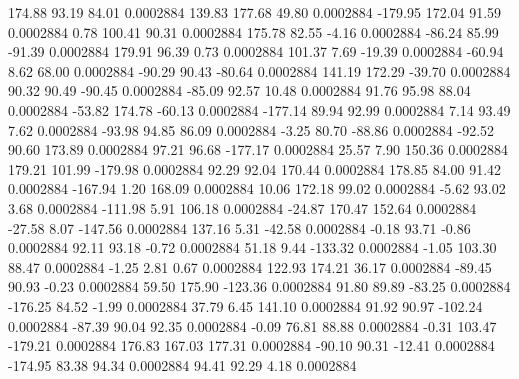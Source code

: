       174.88       93.19       84.01     0.0002884
      139.83      177.68       49.80     0.0002884
     -179.95      172.04       91.59     0.0002884
        0.78      100.41       90.31     0.0002884
      175.78       82.55       -4.16     0.0002884
      -86.24       85.99      -91.39     0.0002884
      179.91       96.39        0.73     0.0002884
      101.37        7.69      -19.39     0.0002884
      -60.94        8.62       68.00     0.0002884
      -90.29       90.43      -80.64     0.0002884
      141.19      172.29      -39.70     0.0002884
       90.32       90.49      -90.45     0.0002884
      -85.09       92.57       10.48     0.0002884
       91.76       95.98       88.04     0.0002884
      -53.82      174.78      -60.13     0.0002884
     -177.14       89.94       92.99     0.0002884
        7.14       93.49        7.62     0.0002884
      -93.98       94.85       86.09     0.0002884
       -3.25       80.70      -88.86     0.0002884
      -92.52       90.60      173.89     0.0002884
       97.21       96.68     -177.17     0.0002884
       25.57        7.90      150.36     0.0002884
      179.21      101.99     -179.98     0.0002884
       92.29       92.04      170.44     0.0002884
      178.85       84.00       91.42     0.0002884
     -167.94        1.20      168.09     0.0002884
       10.06      172.18       99.02     0.0002884
       -5.62       93.02        3.68     0.0002884
     -111.98        5.91      106.18     0.0002884
      -24.87      170.47      152.64     0.0002884
      -27.58        8.07     -147.56     0.0002884
      137.16        5.31      -42.58     0.0002884
       -0.18       93.71       -0.86     0.0002884
       92.11       93.18       -0.72     0.0002884
       51.18        9.44     -133.32     0.0002884
       -1.05      103.30       88.47     0.0002884
       -1.25        2.81        0.67     0.0002884
      122.93      174.21       36.17     0.0002884
      -89.45       90.93       -0.23     0.0002884
       59.50      175.90     -123.36     0.0002884
       91.80       89.89      -83.25     0.0002884
     -176.25       84.52       -1.99     0.0002884
       37.79        6.45      141.10     0.0002884
       91.92       90.97     -102.24     0.0002884
      -87.39       90.04       92.35     0.0002884
       -0.09       76.81       88.88     0.0002884
       -0.31      103.47     -179.21     0.0002884
      176.83      167.03      177.31     0.0002884
      -90.10       90.31      -12.41     0.0002884
     -174.95       83.38       94.34     0.0002884
       94.41       92.29        4.18     0.0002884
